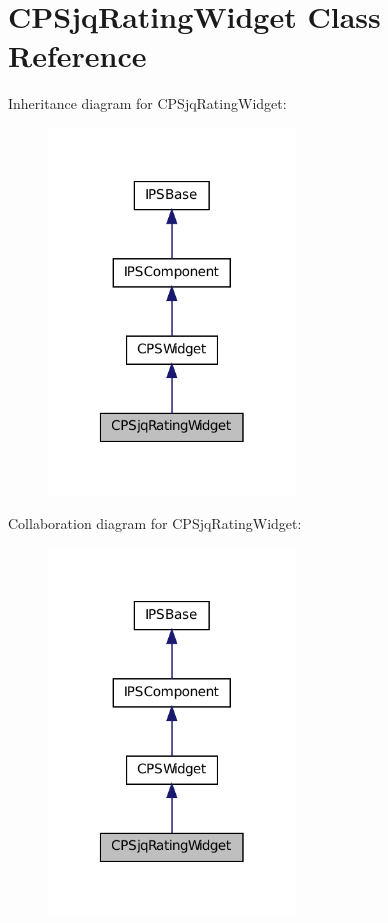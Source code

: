 \hypertarget{classCPSjqRatingWidget}{
\section{CPSjqRatingWidget Class Reference}
\label{classCPSjqRatingWidget}
}


Inheritance diagram for CPSjqRatingWidget:\nopagebreak
\begin{figure}[H]
\begin{center}
\leavevmode
\includegraphics[width=186pt]{classCPSjqRatingWidget__inherit__graph}
\end{center}
\end{figure}


Collaboration diagram for CPSjqRatingWidget:\nopagebreak
\begin{figure}[H]
\begin{center}
\leavevmode
\includegraphics[width=186pt]{classCPSjqRatingWidget__coll__graph}
\end{center}
\end{figure}

